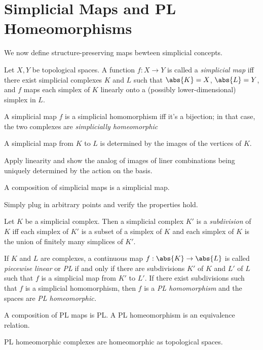\section{Simplicial Maps and PL Homeomorphisms}
We now define structure-preserving maps bewteen simplicial concepts.
\begin{definition}
  Let $X,Y$ be topological spaces. A function $f : X \to Y$ is called a
  \emph{simplicial map} iff there exist simplicial complexes $K$ and $L$ such
  that $\abs{K} = X$, $\abs{L} = Y$, and $f$ maps each simplex of $K$ linearly
  onto a (possibly lower-dimensional) simplex in $L$.
\end{definition}
\begin{definition}
  A simplicial map $f$ is a simplicial homomorphism iff it's a bijection; in
  that case, the two complexes are \emph{simplicially homeomorphic}
\end{definition}
\begin{problem}[15.17]
  A simplicial map from $K$ to $L$ is determined by the images of the vertices
  of $K$.
\end{problem}
\begin{solution}
  Apply linearity and show the analog of images of liner combinations being
  uniquely determined by the action on the basis.
\end{solution}
\begin{problem}[15.18]
  A composition of simplicial maps is a simplicial map.
\end{problem}
\begin{solution}
  Simply plug in arbitrary points and verify the properties hold.
\end{solution}
\begin{definition}
  Let $K$ be a simplicial complex. Then a simplicial complex $K'$ is a
  \emph{subdivision} of $K$ iff each simplex of $K'$ is a subset of a simplex of
  $K$ and each simplex of $K$ is the union of finitely many simplices of $K'$.
\end{definition}
\begin{definition}
  If $K$ and $L$ are complexes, a continuous map $f : \abs{K} \to \abs{L}$ is
  called \emph{piecewise linear} or \emph{PL} if and only if there are
  subdivisions $K'$ of $K$ and $L'$ of $L$ such that $f$ is a simplicial map
  from $K'$ to $L'$. If there exist subdivisions such that $f$ is a simplicial
  homomorphism, then $f$ is a \emph{PL homomorphism} and the spaces are \emph{PL
  homeomorphic.}
\end{definition}
\begin{problem}[15.21]
  A composition of PL maps is PL. A PL homeomorphism is an equivalence relation.
\end{problem}
\begin{problem}[15.22]
  PL homeomorphic complexes are homeomorphic as topological spaces.
\end{problem}


